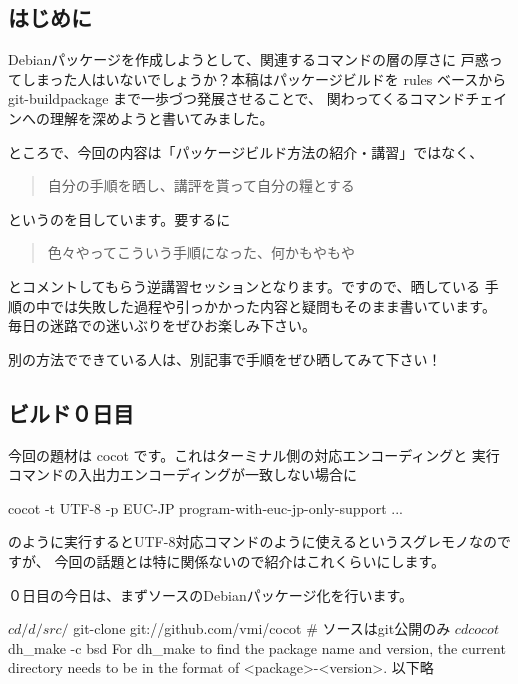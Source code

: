 \documentclass[mingoth,a4paper]{jsarticle}
\begin{document}

\subsection{はじめに}
Debianパッケージを作成しようとして、関連するコマンドの層の厚さに
戸惑ってしまった人はいないでしょうか？本稿はパッケージビルドを
rules ベースから git-buildpackage まで一歩づつ発展させることで、
関わってくるコマンドチェインへの理解を深めようと書いてみました。

ところで、今回の内容は「パッケージビルド方法の紹介・講習」ではなく、

\begin{quote}
\Large{自分の手順を晒し、講評を貰って自分の糧とする}
\end{quote}

というのを目しています。要するに

\begin{quote}
\Large{色々やってこういう手順になった、何かもやもや}
\end{quote}

とコメントしてもらう逆講習セッションとなります。ですので、晒している
手順の中では失敗した過程や引っかかった内容と疑問もそのまま書いています。
毎日の迷路での迷いぶりをぜひお楽しみ下さい。

別の方法でできている人は、別記事で手順をぜひ晒してみて下さい！

\subsection{ビルド０日目}

今回の題材は cocot です。これはターミナル側の対応エンコーディングと
実行コマンドの入出力エンコーディングが一致しない場合に

\begin{commandline}
cocot -t UTF-8 -p EUC-JP program-with-euc-jp-only-support ...
\end{commandline}

のように実行するとUTF-8対応コマンドのように使えるというスグレモノなのですが、
今回の話題とは特に関係ないので紹介はこれくらいにします。

０日目の今日は、まずソースのDebianパッケージ化を行います。

\begin{commandline}
$ cd /d/src/
$ git-clone git://github.com/vmi/cocot # ソースはgit公開のみ
$ cd cocot
$ dh_make -c bsd
For dh_make to find the package name and version, the current directory
needs to be in the format of <package>-<version>. 以下略
\end{commandline}
\end{document}
